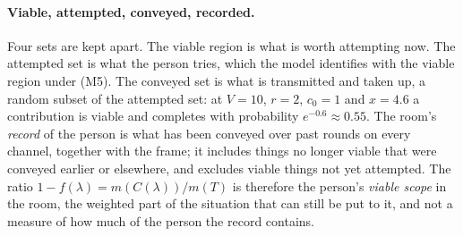 \paragraph{Viable, attempted, conveyed, recorded.} Four sets are kept apart. The viable region is what is worth attempting now. The attempted set is what the person tries, which the model identifies with the viable region under (M5). The conveyed set is what is transmitted and taken up, a random subset of the attempted set: at $V = 10$, $r = 2$, $c_0 = 1$ and $x = 4.6$ a contribution is viable and completes with probability $e^{-0.6} \approx 0.55$. The room's \emph{record} of the person is what has been conveyed over past rounds on every channel, together with the frame; it includes things no longer viable that were conveyed earlier or elsewhere, and excludes viable things not yet attempted. The ratio $1 - f(\lambda) = m(C(\lambda))/m(T)$ is therefore the person's \emph{viable scope} in the room, the weighted part of the situation that can still be put to it, and not a measure of how much of the person the record contains.

